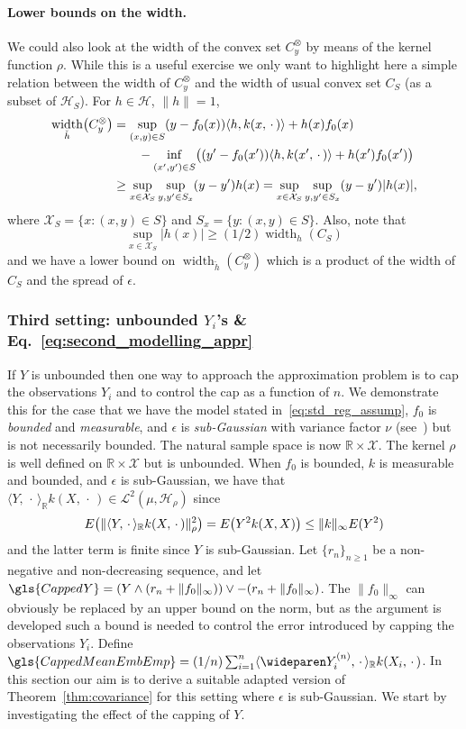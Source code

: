 \documentclass[10pt]{amsart}
\theoremstyle{definition}\newtheorem{defi}[theo]{Definition}\newtheorem{rema}[theo]{Remark}\newtheorem{exam}[theo]{Example}\newtheorem{exem}[theo]{Example}\newtheorem{nota}[theo]{Notation}
\theoremstyle{remark}
\DeclareMathOperator*{\infd}{inf\vphantom{p}}
\DeclareMathOperator{\diam}{width}
\newcommand{\R}{\mathbb{R}}
\newcommand{\X}{\mathcal{X}}
\newcommand{\cH}{\mathcal{H}}
\newcommand{\clL}{\mathcal{L}}
\let\originalleft\left
\let\originalright\right
\renewcommand{\left}{\mathopen{}\mathclose\bgroup\originalleft}
\renewcommand{\right}{\aftergroup\egroup\originalright}
\begin{document}
\paragraph{Lower bounds on the width.} We could also look at the width of the convex set $C_y^\otimes$ by means of the kernel function $\rho$. While this is a useful exercise we only want to highlight here a simple relation between the width of $C_y^\otimes$ and the width of usual convex set $C_S$ (as a subset of $\cH_S$). For $h \in \cH$, $\|h\|=1$,
\begin{align*}
\diam_{\check h} \left(C_y^\otimes\right) &= \sup_{(x,y) \in S} (y - f_0(x)) \langle h, k(x,\,\cdot\,) \rangle + h(x) f_0(x) \\
&\qquad - \infd_{(x',y') \in S} \bigl((y' - f_0(x')) \langle h, k(x',\,\cdot\,) \rangle + h(x') f_0(x')\bigr) \\
&\geq \sup_{x \in \X_S} \sup_{y,y' \in S_x} (y-y') h(x) = \sup_{x \in \X_S} \sup_{y,y' \in S_x} (y-y') |h(x)|,
\end{align*}
where $\X_S = \{x: (x,y) \in S\}$ and $S_x = \{ y : (x,y) \in S\}$. Also, note that
\[
\sup_{x\in \X_S} |h(x)| \geq (1/2) \diam_h(C_S)
\]
and we have a lower bound on $\diam_{\check h} (C_y^\otimes)$ which is a product of the width of $C_S$ and the spread of $\epsilon$.



\subsubsection{Third setting: unbounded \texorpdfstring{$Y_i$}{Y\_i}'s \& Eq.~\eqref{eq:second_modelling_appr}} \label{sec:unbounded_Y}
If $Y$ is unbounded then one way to approach the approximation problem is to cap the observations $Y_i$ and to control the cap as a function of $n$. We demonstrate this for the case that we have the model stated in~\eqref{eq:std_reg_assump}, $f_0$ is \emph{bounded} and \emph{measurable}, and $\epsilon$ is \emph{sub-Gaussian} with variance factor $\nu$ (see~\cite[Section~2.3]{GAB13}) but is not necessarily bounded. The natural sample space is now $\R \times \X$. The kernel $\rho$ is well defined on $\R \times \X$ but is unbounded. When $f_0$ is bounded, $k$ is measurable and bounded, and $\epsilon$ is sub-Gaussian, we have that $\langle Y,\,\cdot\,\rangle_\R k(X,\,\cdot\,) \in \clL^2(\mu,\cH_\rho)$ since
\[
E\left(\| \langle Y,\,\cdot\,\rangle_\R k(X,\,\cdot\,) \|_\rho^2\right) = E\left(Y^2 k(X,X)\right) \leq \|k\|_\infty E(Y^2)
\]
and the latter term is finite since $Y$ is sub-Gaussian. Let $\{r_n\}_{n \geq 1}$ be a non-negative and non-decreasing sequence, and let $\gls{CappedY} = (Y \wedge (r_n + \|f_0\|_\infty)) \vee - (r_n + \|f_0\|_\infty)$. The $\|f_0\|_\infty$ can obviously be replaced by an upper bound on the norm, but as the argument is developed such a bound is needed to control the error introduced by capping the observations $Y_i$. Define $ \gls{CappedMeanEmbEmp} = (1/n) \sum_{i=1}^n \langle \wideparen Y^{(n)}_i, \,\cdot\, \rangle_\R k(X_i, \,\cdot\,)$. In this section our aim is to derive a suitable adapted version of Theorem~\ref{thm:covariance} for this setting where $\epsilon$ is sub-Gaussian. We start by investigating the effect of the capping of $Y$.
\end{document}

